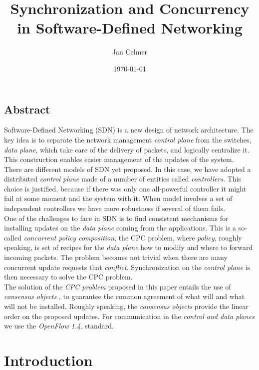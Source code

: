 \documentclass{article}
\title{Synchronization and Concurrency in Software-Defined Networking}
\author{Jan Celmer}
\date{\today}
\theoremstyle{remark}
\begin{document}
\maketitle
\subsection*{Abstract} Software-Defined Networking (SDN) is a new design of network architecture. The key idea is to separate  the network management \emph{control plane} from the switches, \emph{data plane}, which take care of the delivery of packets, and logically centralize it.    \\
This construction enables easier management of the updates of the system.\\
There are different models of SDN yet proposed. In this case, we have adopted a distributed \emph{control plane} made of a number of entities called \emph{controllers}. This choice is justified, because if there was only one all-powerful controller it might fail at some moment and the system with it. When model involves a set of independent controllers we have more robustness if several of them fails.
\\
One of the challenges to face in SDN is to find consistent mechanisms for installing updates on the \emph{data plane} coming from the applications. This is a so-called \emph{concurrent policy composition}, the CPC problem, where \emph{policy}, roughly speaking, is set of recipes for the \emph{data plane} how to modify and where to forward incoming packets. The problem becomes not trivial when there are many concurrent update requests that \emph{conflict}. Synchronization on the \emph{control plane} is then necessary to solve the CPC problem. 
\\
 The solution of the \emph{CPC problem} proposed in this paper entails the use of \emph{consensus objects} , to guarantee the common agreement of what will and what will not be installed. Roughly speaking, the \emph{consensus objects} provide the linear order on the proposed updates. For communication in the \emph{control and data planes} we use the \emph{OpenFlow 1.4.} standard.
\section{Introduction}
\end{document}
